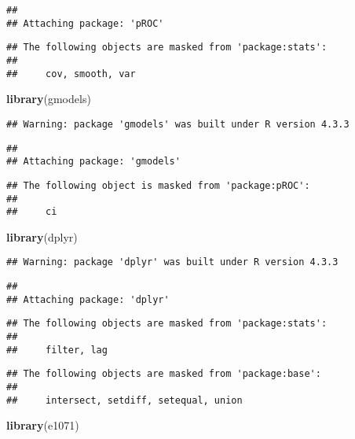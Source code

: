 \documentclass[
]{article}
\newenvironment{Shaded}{\begin{snugshade}}{\end{snugshade}}
\newcommand{\FunctionTok}[1]{\textcolor[rgb]{0.13,0.29,0.53}{\textbf{#1}}}
\newcommand{\NormalTok}[1]{#1}
\begin{document}
\begin{verbatim}
## 
## Attaching package: 'pROC'
\end{verbatim}

\begin{verbatim}
## The following objects are masked from 'package:stats':
## 
##     cov, smooth, var
\end{verbatim}

\begin{Shaded}
\begin{Highlighting}[]
\FunctionTok{library}\NormalTok{(gmodels)}
\end{Highlighting}
\end{Shaded}

\begin{verbatim}
## Warning: package 'gmodels' was built under R version 4.3.3
\end{verbatim}

\begin{verbatim}
## 
## Attaching package: 'gmodels'
\end{verbatim}

\begin{verbatim}
## The following object is masked from 'package:pROC':
## 
##     ci
\end{verbatim}

\begin{Shaded}
\begin{Highlighting}[]
\FunctionTok{library}\NormalTok{(dplyr) }
\end{Highlighting}
\end{Shaded}

\begin{verbatim}
## Warning: package 'dplyr' was built under R version 4.3.3
\end{verbatim}

\begin{verbatim}
## 
## Attaching package: 'dplyr'
\end{verbatim}

\begin{verbatim}
## The following objects are masked from 'package:stats':
## 
##     filter, lag
\end{verbatim}

\begin{verbatim}
## The following objects are masked from 'package:base':
## 
##     intersect, setdiff, setequal, union
\end{verbatim}

\begin{Shaded}
\begin{Highlighting}[]
\FunctionTok{library}\NormalTok{(e1071)}
\end{Highlighting}
\end{Shaded}
\end{document}
